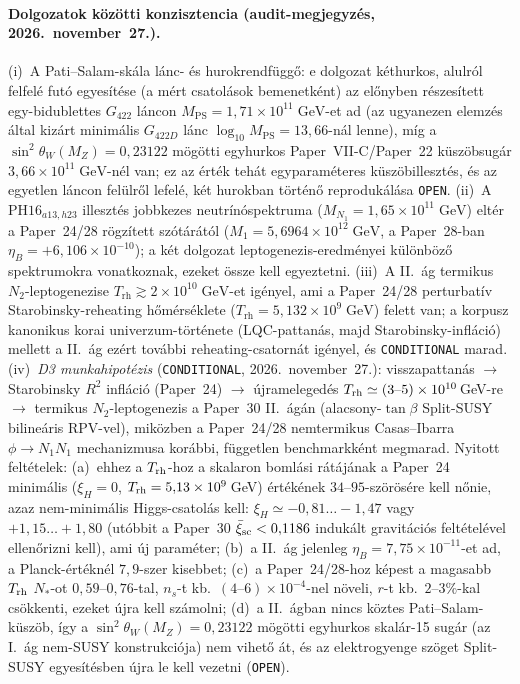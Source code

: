 \documentclass[11pt,a4paper]{article}
\begin{document}
\paragraph{Dolgozatok közötti konzisztencia (audit-megjegyzés, 2026.~november~27.).}
(i)~A Pati--Salam-skála lánc- és hurokrendfügg\H{o}: e dolgozat kéthurkos, alulról felfelé futó egyesítése (a mért csatolások bemenetként) az el\H{o}nyben részesített egy-bidublettes $G_{422}$ láncon $M_{\mathrm{PS}} = 1{,}71\times 10^{11}\;\mathrm{GeV}$-et ad (az ugyanezen elemzés által kizárt minimális $G_{422D}$ lánc $\log_{10}M_{\mathrm{PS}} = 13{,}66$-nál lenne), míg a $\sin^2\theta_W(M_Z) = 0{,}23122$ mögötti egyhurkos Paper~VII-C/Paper~22 küszöbsugár $3{,}66\times 10^{11}\;\mathrm{GeV}$-nél van; ez az érték tehát egyparaméteres küszöbillesztés, és az egyetlen láncon felülr\H{o}l lefelé, két hurokban történ\H{o} reprodukálása \texttt{OPEN}. (ii)~A $\mathrm{PH16}_{a13,h23}$ illesztés jobbkezes neutrínóspektruma ($M_{N_1} = 1{,}65\times 10^{11}\;\mathrm{GeV}$) eltér a Paper~24/28 rögzített szótárától ($M_1 = 5{,}6964\times 10^{12}\;\mathrm{GeV}$, a Paper~28-ban $\eta_B = +6{,}106\times 10^{-10}$); a két dolgozat leptogenezis-eredményei különböz\H{o} spektrumokra vonatkoznak, ezeket össze kell egyeztetni. (iii)~A II.~ág termikus $N_2$-leptogenezise $T_{\mathrm{rh}} \gtrsim 2\times 10^{10}\;\mathrm{GeV}$-et igényel, ami a Paper~24/28 perturbatív Starobinsky-reheating h\H{o}mérséklete ($T_{\mathrm{rh}} = 5{,}132\times 10^{9}\;\mathrm{GeV}$) felett van; a korpusz kanonikus korai univerzum-története (LQC-pattanás, majd Starobinsky-infláció) mellett a II.~ág ezért további reheating-csatornát igényel, és \texttt{CONDITIONAL} marad. (iv)~\emph{D3 munkahipotézis} (\texttt{CONDITIONAL}, 2026.~november~27.): visszapattanás $\to$ Starobinsky $R^2$ infláció (Paper~24) $\to$ újramelegedés $T_{\rm rh}\simeq(3\text{--}5)\times10^{10}$\,GeV-re $\to$ termikus $N_2$-leptogenezis a Paper~30 II.~ágán (alacsony-$\tan\beta$ Split-SUSY bilineáris RPV-vel), miközben a Paper~24/28 nemtermikus Casas--Ibarra $\phi\to N_1N_1$ mechanizmusa korábbi, független benchmarkként megmarad. Nyitott feltételek: (a)~ehhez a $T_{\rm rh}$-hoz a skalaron bomlási rátájának a Paper~24 minimális ($\xi_H=0$, $T_{\rm rh}=5{,}13\times10^{9}$\,GeV) értékének $34$--$95$-szörösére kell n\H{o}nie, azaz nem-minimális Higgs-csatolás kell: $\xi_H\simeq-0{,}81\ldots-1{,}47$ vagy $+1{,}15\ldots+1{,}80$ (utóbbit a Paper~30 $\bar\xi_{\rm sc}<0{,}1186$ indukált gravitációs feltételével ellen\H{o}rizni kell), ami új paraméter; (b)~a II.~ág jelenleg $\eta_B=7{,}75\times10^{-11}$-et ad, a Planck-értéknél $7{,}9$-szer kisebbet; (c)~a Paper~24/28-hoz képest a magasabb $T_{\rm rh}$ $N_*$-ot $0{,}59$--$0{,}76$-tal, $n_s$-t kb.\ $(4\text{--}6)\times10^{-4}$-nel növeli, $r$-t kb.\ $2$--$3\%$-kal csökkenti, ezeket újra kell számolni; (d)~a II.~ágban nincs köztes Pati--Salam-küszöb, így a $\sin^2\theta_W(M_Z)=0{,}23122$ mögötti egyhurkos skalár-15 sugár (az I.~ág nem-SUSY konstrukciója) nem vihet\H{o} át, és az elektrogyenge szöget Split-SUSY egyesítésben újra le kell vezetni (\texttt{OPEN}).
\end{document}
